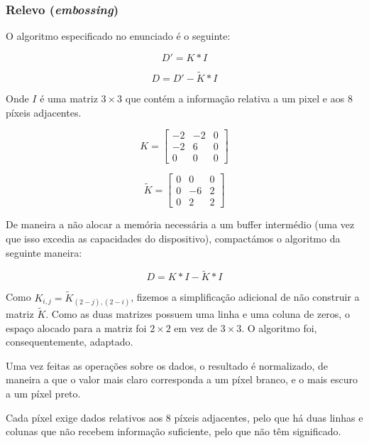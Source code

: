\documentclass[a4paper,12pt]{article}
\begin{document}


\subsubsection{Relevo (\textit{embossing})}
\label{subsec:relevo}

O algoritmo especificado no enunciado é o seguinte:

\[
D' = K \ast I
\]

\[
D = D' - \widetilde{K} \ast I
\]

Onde $I$ é uma matriz $3 \times 3$ que contém a informação relativa a um pixel e aos 8 píxeis adjacentes.

\[ K =
\begin{bmatrix}
-2 & -2 & 0\\
-2 & 6 & 0\\
0 & 0 & 0
\end{bmatrix}
\]

\[\widetilde{K} = 
\begin{bmatrix}
0&0&0\\
0&-6&2\\
0&2&2
\end{bmatrix}
\]

De maneira a não alocar a memória necessária a um buffer intermédio (uma vez que isso excedia as capacidades do dispositivo), compactámos o algoritmo da seguinte maneira:

\[
D = K \ast I - \widetilde{K} \ast I
\]

Como $K_{i,j} = \widetilde{K}_{(2-j),(2-i)}$, fizemos a simplificação adicional de não construir a matriz $\widetilde{K}$. Como as duas matrizes possuem uma linha e uma coluna de zeros, o espaço alocado para a matriz foi $2\times2$ em vez de $3\times3$. O algoritmo foi, consequentemente, adaptado.

Uma vez feitas as operações sobre os dados, o resultado é normalizado, de maneira a que o valor mais claro corresponda a um píxel branco, e o mais escuro a um píxel preto.

Cada píxel exige dados relativos aos 8 píxeis adjacentes, pelo que há duas linhas e colunas que não recebem informação suficiente, pelo que não têm significado.


\end{document}
